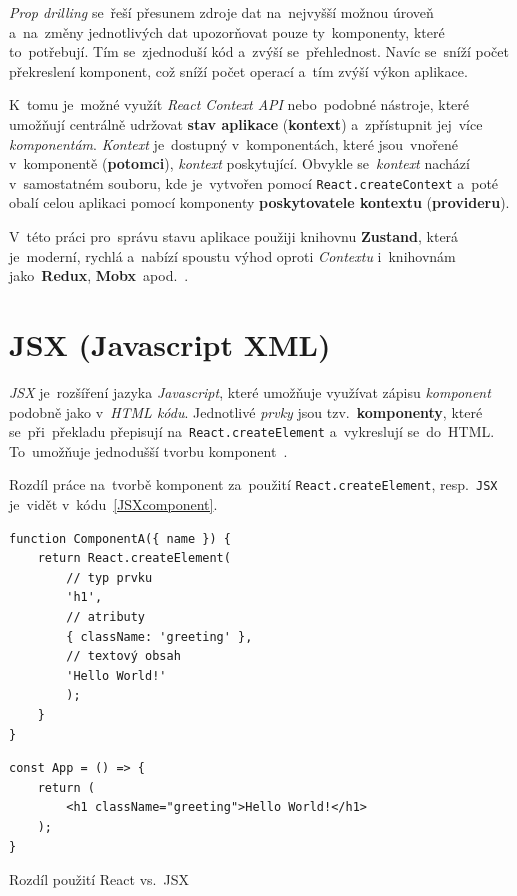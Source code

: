 \documentclass[11pt,a4paper]{report}
\begin{document}
            \emph{Prop drilling} se~řeší přesunem zdroje dat na~nejvyšší možnou úroveň a~na~změny jednotlivých dat upozorňovat pouze ty~komponenty, které to~potřebují. Tím se~zjednoduší kód a~zvýší se~přehlednost. Navíc se~sníží počet překreslení komponent, což sníží počet operací a~tím zvýší výkon aplikace.
            
            K~tomu je~možné využít \emph{React Context API} nebo~podobné nástroje, které umožňují centrálně udržovat \textbf{stav aplikace} (\textbf{kontext}) a~zpřístupnit jej~více \emph{komponentám}. \emph{Kontext} je~dostupný v~komponentách, které jsou~vnořené v~komponentě (\textbf{potomci}), \emph{kontext} poskytující. Obvykle se~\emph{kontext} nachází v~samostatném souboru, kde je~vytvořen pomocí \texttt{React.createContext} a~poté obalí celou aplikaci pomocí komponenty \textbf{poskytovatele kontextu} (\textbf{provideru}).
            
            V~této práci pro~správu stavu aplikace použiji knihovnu \textbf{Zustand}, která je~moderní, rychlá a~nabízí spoustu výhod oproti \emph{Contextu} i~knihovnám jako~\textbf{Redux}, \textbf{Mobx}~apod.~\cite{openreplayReactState}.

        \section{JSX (Javascript XML)}
            \emph{JSX} je~rozšíření jazyka \emph{Javascript}, které umožňuje využívat zápisu \emph{komponent} podobně jako v~\emph{HTML kódu}. Jednotlivé \emph{prvky} jsou tzv.~\textbf{komponenty}, které se~při~překladu přepisují na~\texttt{React.createElement} a~vykreslují se~do~HTML. To~umožňuje jednodušší tvorbu komponent~\cite{reactJSX}.
            
            Rozdíl práce na~tvorbě komponent za~použití \texttt{React.createElement}, resp.~\texttt{JSX} je~vidět v~kódu~\ref{JSXcomponent}.
            \begin{code}
                \centering
                \begin{minipage}{0.45\textwidth}
                    \begin{verbatim}
function ComponentA({ name }) {
    return React.createElement(
        // typ prvku
        'h1',
        // atributy
        { className: 'greeting' },
        // textový obsah
        'Hello World!'
        );
    }
}
                    \end{verbatim}
                \end{minipage}
                \begin{minipage}{0.45\textwidth}
                    \begin{verbatim}
const App = () => {
    return (
        <h1 className="greeting">Hello World!</h1>
    );
}
                    \end{verbatim}
                \end{minipage}
                \caption{Rozdíl použití React vs.~JSX}
                \label{JSXcomponent}
            \end{code}
\end{document}
